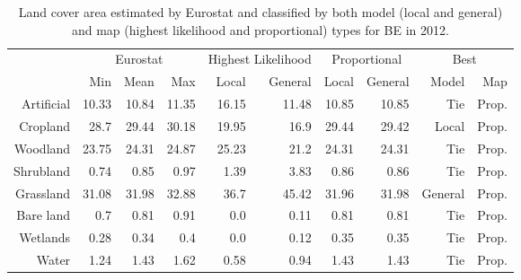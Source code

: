 \begin{table}[H]
\centering
\caption{Land cover area estimated by Eurostat and classified by both model (local and general) and map (highest likelihood and proportional) types for BE in 2012.}

\begin{tabular}{r|rrr|rr|rr|rr}
\toprule
{} & \multicolumn{3}{|c}{Eurostat} & \multicolumn{2}{|c}{Highest Likelihood} & \multicolumn{2}{|c}{Proportional} & \multicolumn{2}{|c}{Best} \\
{} &      Min &   Mean &    Max &              Local & General &        Local & General &    Model &    Map \\
\midrule
Artificial &    10.33 &  10.84 &  11.35 &              16.15 &   11.48 &        10.85 &   10.85 &      Tie &  Prop. \\
Cropland   &     28.7 &  29.44 &  30.18 &              19.95 &    16.9 &        29.44 &   29.42 &    Local &  Prop. \\
Woodland   &    23.75 &  24.31 &  24.87 &              25.23 &    21.2 &        24.31 &   24.31 &      Tie &  Prop. \\
Shrubland  &     0.74 &   0.85 &   0.97 &               1.39 &    3.83 &         0.86 &    0.86 &      Tie &  Prop. \\
Grassland  &    31.08 &  31.98 &  32.88 &               36.7 &   45.42 &        31.96 &   31.98 &  General &  Prop. \\
Bare land  &      0.7 &   0.81 &   0.91 &                0.0 &    0.11 &         0.81 &    0.81 &      Tie &  Prop. \\
Wetlands   &     0.28 &   0.34 &    0.4 &                0.0 &    0.12 &         0.35 &    0.35 &      Tie &  Prop. \\
Water      &     1.24 &   1.43 &   1.62 &               0.58 &    0.94 &         1.43 &    1.43 &      Tie &  Prop. \\
\bottomrule
\end{tabular}
\end{table}

